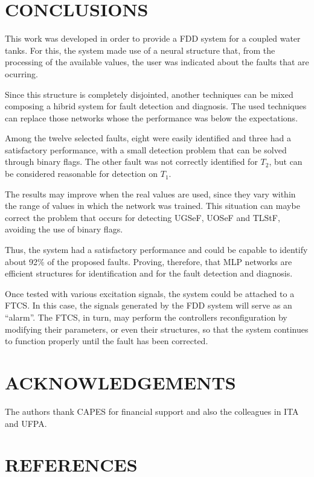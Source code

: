 \documentclass[10pt,fleqn,a4paper]{article}
\begin{document}
\section{CONCLUSIONS}\label{sec:conclusions}
This work was developed in order to provide a FDD system for a coupled water
tanks. For this, the system made use of a neural structure that, from the
processing of the available values, the user was indicated about the faults that
are ocurring.

Since this structure is completely disjointed, another techniques can be mixed
composing a hibrid system for fault detection and diagnosis. The used techniques
can replace those networks whose the performance was below the expectations.

Among the twelve selected faults, eight were easily identified and three had a
satisfactory performance, with a small detection problem that can be solved
through binary flags. The other fault was not correctly identified for $T_2$,
but can be considered reasonable for detection on $T_1$.

The results may improve when the real values are used, since they vary within
the range of values in which the network was trained. This situation can maybe
correct the problem that occurs for detecting UGSeF, UOSeF and TLStF, avoiding
the use of binary flags.

Thus, the system had a satisfactory performance and could be capable to identify
about 92\% of the proposed faults. Proving, therefore, that MLP networks are
efficient structures for identification and for the fault detection and
diagnosis.

Once tested with various excitation signals, the system could be attached to a
FTCS. In this case, the signals generated by the FDD system will serve as an
``alarm''. The FTCS, in turn, may perform the controllers reconfiguration by
modifying their parameters, or even their structures, so that the system
continues to function properly until the fault has been corrected.

\section{ACKNOWLEDGEMENTS}
The authors thank CAPES for financial support and also the colleagues in ITA and
UFPA.

\section{REFERENCES}


\renewcommand{\refname}{}

\end{document}
